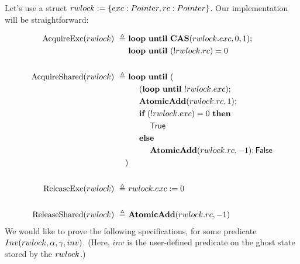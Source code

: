 \documentclass{article}
\newcommand{\true}{\textsf{True}}
\newcommand{\false}{\textsf{False}}
\renewcommand{\eqdef}{\triangleq}
\begin{document}
\newcommand{\CAS}{\textbf{CAS}}
\newcommand{\AtomicAdd}{\textbf{AtomicAdd}}

\newcommand{\Inv}{Inv}
\newcommand{\inv}{inv}
\newcommand{\inlinehoare}[1]{{\color{blue}\left\{#1\right\}}}

Let's use a struct $rwlock := \{exc: Pointer, rc: Pointer\}$. Our implementation will be straightforward:

\begin{align*}
  \AcquireExc(\rwlock) ~\eqdef~
      & \langloop~\until~\CAS(\rwlock.\exc,0,1);\\
      & \langloop~\until~(!\rwlock.\rc) = 0\\
      \\
  \AcquireShared(\rwlock) ~\eqdef~
      & \langloop~\until~(\\
        & ~~~~ (\langloop~\until~!\rwlock.\exc);\\
        & ~~~~ \AtomicAdd(\rwlock.\rc, 1);\\
        & ~~~~ \langif~ (!\rwlock.\exc) = 0 ~\langthen\\
        & ~~~~~~~~ \true\\
        & ~~~~ \langelse\\
        & ~~~~~~~~ \AtomicAdd(\rwlock.\rc, -1); \false\\
      )\\
      \\
  \ReleaseExc(\rwlock) ~\eqdef~
      & \rwlock.\exc := 0\\
      \\
  \ReleaseShared(\rwlock) ~\eqdef~
      & \AtomicAdd(\rwlock.\rc, -1)
\end{align*}
We would like to prove the following specifications, for some predicate $\Inv(\rwlock,\alpha,\gamma,\inv)$. (Here, $\inv$ is the user-defined predicate on the ghost state stored by the $rwlock$.)
\end{document}
